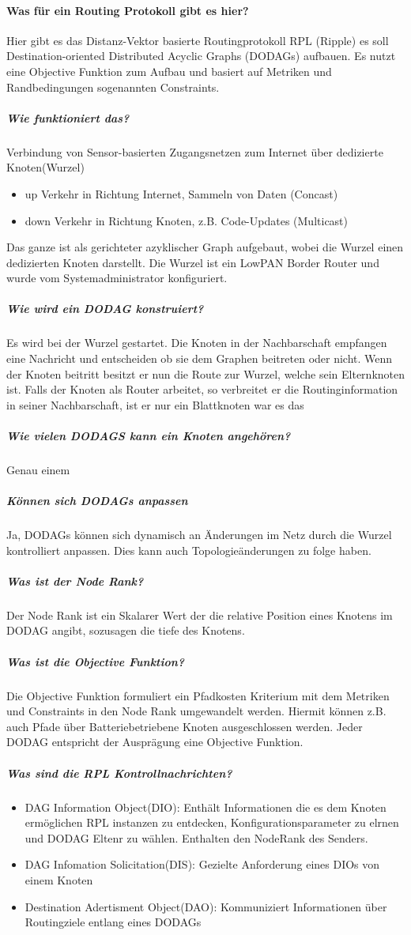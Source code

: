 	\paragraph{Was für ein Routing Protokoll gibt es hier?}
	Hier gibt es das Distanz-Vektor basierte Routingprotokoll RPL (Ripple) es soll Destination-oriented Distributed Acyclic Graphs (DODAGs) aufbauen. Es nutzt eine Objective Funktion zum Aufbau und basiert auf Metriken und Randbedingungen sogenannten Constraints.
	\subparagraph{Wie funktioniert das?}
	Verbindung von Sensor-basierten Zugangsnetzen zum Internet über dedizierte Knoten(Wurzel)
	\begin{itemize}
		\item{up} Verkehr in Richtung Internet, Sammeln von Daten (Concast)
		\item{down} Verkehr in Richtung Knoten, z.B. Code-Updates (Multicast)
	\end{itemize}
	
	Das ganze ist als gerichteter azyklischer Graph aufgebaut, wobei die Wurzel einen dedizierten Knoten darstellt. Die Wurzel ist ein LowPAN Border Router und wurde vom Systemadministrator konfiguriert.
	
	\subparagraph{Wie wird ein DODAG konstruiert?}
	Es wird bei der Wurzel gestartet. Die Knoten in der Nachbarschaft empfangen eine Nachricht und entscheiden ob sie dem Graphen beitreten oder nicht. 
	Wenn der Knoten beitritt besitzt er nun die Route zur Wurzel, welche sein Elternknoten ist. Falls der Knoten als Router arbeitet, so verbreitet er die Routinginformation in seiner Nachbarschaft, ist er nur ein Blattknoten war es das
	
	\subparagraph{Wie vielen DODAGS kann ein Knoten angehören?}
	Genau einem
	
	\subparagraph{Können sich DODAGs anpassen}
	Ja, DODAGs können sich dynamisch an Änderungen im Netz durch die Wurzel kontrolliert anpassen. Dies kann auch Topologieänderungen zu folge haben.
	
	\subparagraph{Was ist der Node Rank?}
	Der Node Rank ist ein Skalarer Wert der die relative Position eines Knotens im DODAG angibt, sozusagen die tiefe des Knotens.
	
	\subparagraph{Was ist die Objective Funktion?}
	Die Objective Funktion formuliert ein Pfadkosten Kriterium mit dem Metriken und Constraints in den Node Rank umgewandelt werden.
	Hiermit können z.B. auch Pfade über Batteriebetriebene Knoten ausgeschlossen werden.
	Jeder DODAG entspricht der Ausprägung eine Objective Funktion.
	\subparagraph{Was sind die RPL Kontrollnachrichten?}
	\begin{itemize}
		\item{DAG Information Object(DIO): }Enthält Informationen die es dem Knoten ermöglichen RPL instanzen zu entdecken, Konfigurationsparameter zu elrnen und DODAG Eltenr zu wählen. Enthalten den NodeRank des Senders.
		\item{DAG Infomation Solicitation(DIS): }Gezielte Anforderung eines DIOs von einem Knoten
		\item{Destination Adertisment Object(DAO): }Kommuniziert Informationen über Routingziele entlang eines DODAGs
	\end{itemize}
	
